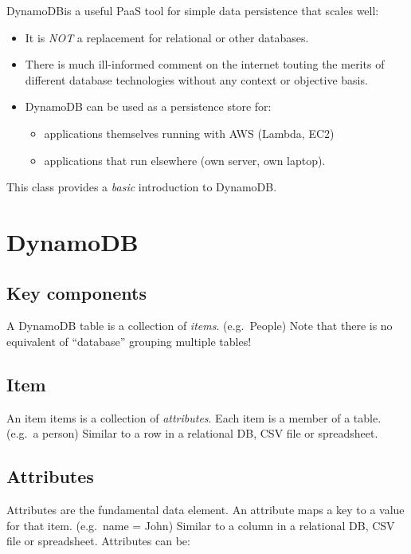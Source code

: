 \documentclass[slides]{pgnotes}
\begin{document}
DynamoDBis a useful PaaS tool for simple data persistence that scales well:
\begin{itemize}
\item It is \emph{NOT} a replacement for relational or other databases.
\item There is much ill-informed comment on the internet touting the merits of different database technologies without any context or objective basis.
\item DynamoDB can be used as a persistence store for:
  \begin{itemize}
  \item applications themselves running with AWS (Lambda, EC2)
  \item applications that run elsewhere (own server, own laptop).
  \end{itemize}
\end{itemize}
  
This class provides a \emph{basic} introduction to DynamoDB.


\section{DynamoDB}\label{sec:dynamodb}

\subsection{Key components}\label{sec:key-components}

A DynamoDB table is a collection of \emph{items}. (e.g.~People) Note
that there is no equivalent of ``database'' grouping multiple tables!

\subsection{Item}\label{sec:item}

An item items is a collection of \emph{attributes}. Each item is a
member of a table. (e.g.~a person) Similar to a row in a relational DB,
CSV file or spreadsheet.

\subsection{Attributes}\label{sec:attributes}

Attributes are the fundamental data element. An attribute maps a key to
a value for that item. (e.g.~name = John) Similar to a column in a
relational DB, CSV file or spreadsheet. Attributes can be:
\end{document}
